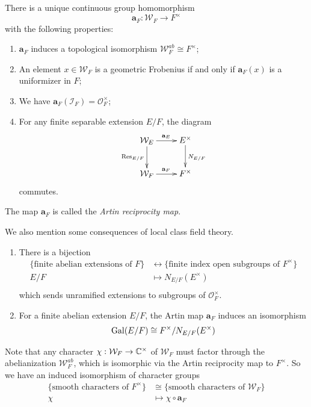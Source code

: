 \begin{thm}\label{thm:lcf}
	There is a unique continuous group homomorphism
	\[\mathbf{a}_F: \mathcal{W}_F\to F^\times\]
	with the following properties:
	\begin{enumerate}
		\item $\mathbf{a}_F$ induces a topological isomorphism $\mathcal{W}_F^{ab}\cong F^\times$;
		\item An element $x\in \mathcal{W}_F$ is a geometric Frobenius if and only if $\mathbf{a}_F(x)$ is a uniformizer in $F$;
		\item We have $\mathbf{a}_F(\mathcal{I}_F) = \mathcal{O}_F^\times$;
		\item For any finite separable extension $E/F$, the diagram 
		$$\xymatrix{
			\mathcal W_E \ar[r]^{\mathbf a_E} \ar[d]_{\Res_{E/F}} & E^\times \ar[d]^{N_{E/F}} \\
			\mathcal W_F \ar[r]^{\mathbf a_F} & F^\times
		}$$
		commutes.
	\end{enumerate}
	The map $\mathbf{a}_F$ is called the \emph{Artin reciprocity map}.
\end{thm}
We also mention some consequences of local class field theory.
\begin{cor}
	\begin{enumerate}
	\item There is a bijection
		\begin{align*}
			\{\text{finite abelian extensions of $F$}\} &\leftrightarrow \{\text{finite index open subgroups of $F^\times$}\}\\
				E/F &\mapsto N_{E/F}(E^\times)\\
		\end{align*}
		which sends unramified extensions to subgroups of $\mathcal{O}_F^\times$.
	\item For a finite abelian extension $E/F$, the Artin map $\mathbf{a}_F$ induces an isomorphism
		\[\mathrm{Gal}(E/F)\cong F^\times/N_{E/F}(E^\times)\]
	\end{enumerate}
\end{cor}
Note that any character $\chi: \mathcal{W}_F\to \mathbb{C}^\times$ of $\mathcal{W}_F$ must factor through the abelianization $\mathcal{W}_F^{ab}$, which is isomorphic via the Artin reciprocity map to $F^\times$. So we have an induced isomorphism of character groups
\begin{align*}
	\{\text{smooth characters of }F^\times\} &\cong \{\text{smooth characters of }\mathcal{W}_F\}\\
	\chi &\mapsto \chi\circ\mathbf{a}_F
\end{align*}
